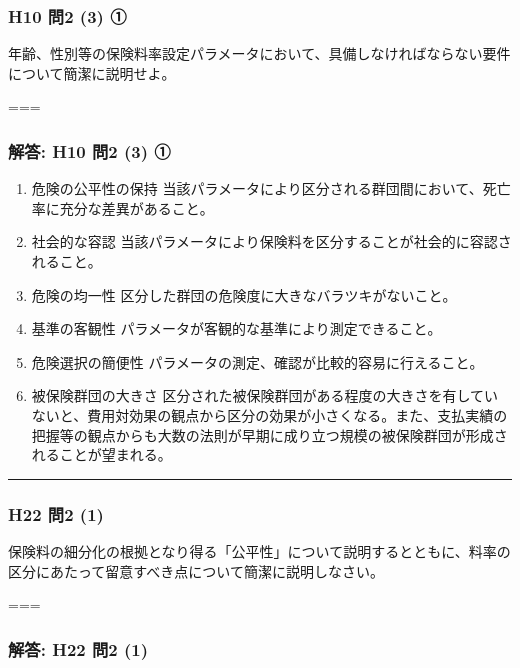 \documentclass[]{article}
\begin{document}
\hypertarget{h10-ux554f2-3-ux2460}{%
\subsubsection{H10 問2 (3) ①}\label{h10-ux554f2-3-ux2460}}

年齢、性別等の保険料率設定パラメータにおいて、具備しなければならない要件について簡潔に説明せよ。

===

\hypertarget{ux89e3ux7b54-h10-ux554f2-3-ux2460}{%
\subsubsection{解答: H10 問2 (3)
①}\label{ux89e3ux7b54-h10-ux554f2-3-ux2460}}

\begin{enumerate}
\def\labelenumi{\arabic{enumi}.}
\tightlist
\item
  危険の公平性の保持
  当該パラメータにより区分される群団間において、死亡率に充分な差異があること。
\item
  社会的な容認
  当該パラメータにより保険料を区分することが社会的に容認されること。
\item
  危険の均一性 区分した群団の危険度に大きなバラツキがないこと。
\item
  基準の客観性 パラメータが客観的な基準により測定できること。
\item
  危険選択の簡便性 パラメータの測定、確認が比較的容易に行えること。
\item
  被保険群団の大きさ
  区分された被保険群団がある程度の大きさを有していないと、費用対効果の観点から区分の効果が小さくなる。また、支払実績の把握等の観点からも大数の法則が早期に成り立つ規模の被保険群団が形成されることが望まれる。
\end{enumerate}

\begin{center}\rule{0.5\linewidth}{0.5pt}\end{center}

\hypertarget{h22-ux554f2-1}{%
\subsubsection{H22 問2 (1)}\label{h22-ux554f2-1}}

保険料の細分化の根拠となり得る「公平性」について説明するとともに、料率の区分にあたって留意すべき点について簡潔に説明しなさい。

===

\hypertarget{ux89e3ux7b54-h22-ux554f2-1}{%
\subsubsection{解答: H22 問2 (1)}\label{ux89e3ux7b54-h22-ux554f2-1}}
\end{document}
